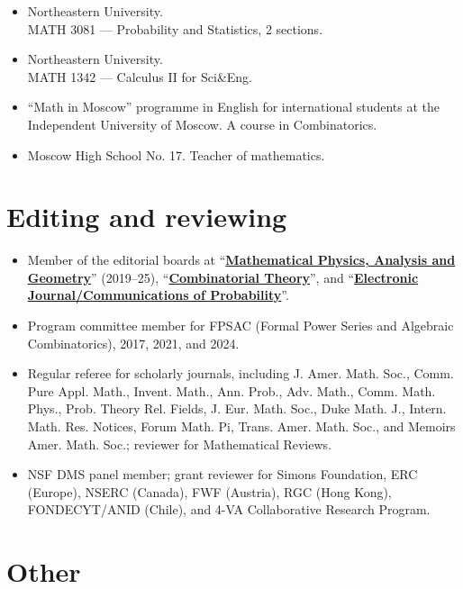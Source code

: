 \documentclass[letterpaper,11pt]{article}
\begin{document}
\begin{itemize}
	\item
	      [Spring 2012:]
	      Northeastern University. \\ MATH 3081 --- Probability and
	      Statistics, 2 sections.
	\item
	      [Fall 2011:]
	      Northeastern University.\\ MATH 1342 --- Calculus II for
	      Sci\&Eng.
	\item
	      [Spring 2011:]
	      ``Math in Moscow'' programme in English for international
	      students at the Independent University of Moscow. A course in
	      Combinatorics.

	\item
	      [2007---2008:]
	      Moscow High School No. 17. Teacher of mathematics.
\end{itemize}

\section*{Editing and reviewing}

\begin{itemize}
	\item
	Member of the editorial boards at
	``\href{https://www.springer.com/journal/11040}{\textbf{Mathematical Physics, Analysis and Geometry}}'' (2019--25),
	``\href{https://escholarship.org/uc/combinatorial_theory/}{\textbf{Combinatorial Theory}}'',
	and ``\href{https://imstat.org/journals-and-publications/electronic-journal-of-probability/}{\textbf{Electronic Journal/Communications of Probability}}''.
	\item Program committee member for FPSAC (Formal Power Series and Algebraic Combinatorics),
		2017, 2021, and 2024.
	\item
	Regular referee for scholarly journals, including
	J. Amer. Math. Soc.,
	Comm. Pure Appl. Math.,
	Invent. Math.,
	Ann. Prob.,
	Adv. Math.,
	Comm. Math. Phys.,
	Prob. Theory Rel. Fields,
	J. Eur. Math. Soc.,
	Duke Math. J.,
	Intern. Math. Res. Notices,
	Forum Math. Pi,
	Trans. Amer. Math. Soc.,
	and Memoirs Amer. Math. Soc.;
	reviewer for Mathematical Reviews.
	\item
	NSF DMS panel member;
	grant reviewer for Simons Foundation, ERC (Europe), NSERC (Canada), FWF (Austria), RGC (Hong Kong), FONDECYT/ANID (Chile),
	and 4-VA Collaborative Research Program.
\end{itemize}

\section*{Other}
\end{document}
